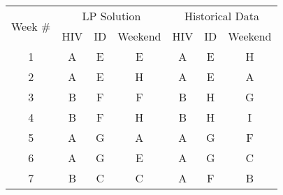 \begin{table}[htbp]
  \centering
	\begin{adjustbox}{scale=0.8}
    \begin{tabular}{c||ccc||ccc}
    \multicolumn{1}{c||}{\multirow{2}[1]{*}{Week \#}} & \multicolumn{3}{c||}{LP Solution} & \multicolumn{3}{c}{Historical Data} \\
          & HIV   & ID    & Weekend & HIV   & ID    & Weekend \\
    \midrule
    \midrule
    1     & \cellcolor[rgb]{ .663,  .816,  .557}A & \cellcolor[rgb]{ .957,  .69,  .518}E & \cellcolor[rgb]{ .957,  .69,  .518}E & \cellcolor[rgb]{ .663,  .816,  .557}A & \cellcolor[rgb]{ .957,  .69,  .518}E & \cellcolor[rgb]{ .459,  .443,  .443}H \\
    2     & \cellcolor[rgb]{ .663,  .816,  .557}A & \cellcolor[rgb]{ .957,  .69,  .518}E & \cellcolor[rgb]{ .459,  .443,  .443}H & \cellcolor[rgb]{ .663,  .816,  .557}A & \cellcolor[rgb]{ .957,  .69,  .518}E & \cellcolor[rgb]{ .663,  .816,  .557}A \\
    3     & \cellcolor[rgb]{ .608,  .761,  .902}B & \cellcolor[rgb]{ .557,  .663,  .859}F & \cellcolor[rgb]{ .557,  .663,  .859}F & \cellcolor[rgb]{ .608,  .761,  .902}B & \cellcolor[rgb]{ .459,  .443,  .443}H & \cellcolor[rgb]{ .518,  .592,  .69}G \\
    4     & \cellcolor[rgb]{ .608,  .761,  .902}B & \cellcolor[rgb]{ .557,  .663,  .859}F & \cellcolor[rgb]{ .459,  .443,  .443}H & \cellcolor[rgb]{ .608,  .761,  .902}B & \cellcolor[rgb]{ .459,  .443,  .443}H & \cellcolor[rgb]{ .251,  .251,  .251}\textcolor[rgb]{ 1,  1,  1}{I} \\
    5     & \cellcolor[rgb]{ .663,  .816,  .557}A & \cellcolor[rgb]{ .518,  .592,  .69}G & \cellcolor[rgb]{ .663,  .816,  .557}A & \cellcolor[rgb]{ .663,  .816,  .557}A & \cellcolor[rgb]{ .518,  .592,  .69}G & \cellcolor[rgb]{ .557,  .663,  .859}F \\
    6     & \cellcolor[rgb]{ .663,  .816,  .557}A & \cellcolor[rgb]{ .518,  .592,  .69}G & \cellcolor[rgb]{ .957,  .69,  .518}E & \cellcolor[rgb]{ .663,  .816,  .557}A & \cellcolor[rgb]{ .518,  .592,  .69}G & \cellcolor[rgb]{ 1,  .851,  .4}C \\
    7     & \cellcolor[rgb]{ .608,  .761,  .902}B & \cellcolor[rgb]{ 1,  .851,  .4}C & \cellcolor[rgb]{ 1,  .851,  .4}C & \cellcolor[rgb]{ .663,  .816,  .557}A & \cellcolor[rgb]{ .557,  .663,  .859}F & \cellcolor[rgb]{ .608,  .761,  .902}B \\

\end{tabular}
\end{adjustbox}
\end{table}
